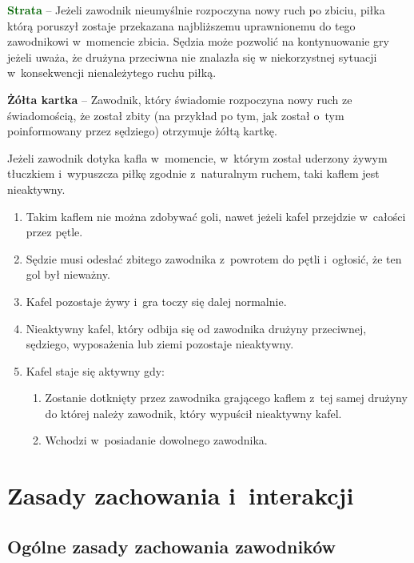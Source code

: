 \documentclass[12pt,a4paper]{article}
\renewcommand{\paragraph}[1]{
  \oldparagraph{#1}%
  \leftskip2.8cm
}
\newcommand\yellowcard[1]{\bgroup\textcolor{darkyellow}{\textbf{#1}}}
\newcommand\other[1]{\bgroup\textcolor{darkgreen}{\textbf{#1}}}
\begin{document}
\other{Strata} -- Jeżeli zawodnik nieumyślnie rozpoczyna nowy ruch po
zbiciu, piłka którą poruszył zostaje przekazana najbliższemu
uprawnionemu do tego zawodnikowi w~momencie zbicia. Sędzia może pozwolić
na kontynuowanie gry jeżeli uważa, że drużyna przeciwna nie znalazła się
w niekorzystnej sytuacji w~konsekwencji nienależytego ruchu piłką.

\yellowcard{Żółta kartka} -- Zawodnik, który świadomie rozpoczyna nowy ruch ze
świadomością, że został zbity (na przykład po tym, jak został o~tym
poinformowany przez sędziego) otrzymuje żółtą kartkę.

\paragraph{Nieaktywny kafel}
Jeżeli zawodnik dotyka kafla w~momencie, w~którym został uderzony żywym tłuczkiem i~wypuszcza piłkę
zgodnie z~naturalnym ruchem, taki kaflem jest nieaktywny.

\begin{enumerate}
	\item
	      Takim kaflem nie można zdobywać goli, nawet jeżeli kafel przejdzie w~całości przez pętle.
	\item
	      Sędzie musi odesłać zbitego zawodnika z~powrotem do pętli i~ogłosić,
	      że ten gol był nieważny.
	\item
	      Kafel pozostaje żywy i~gra toczy się dalej normalnie.
	\item
	      Nieaktywny kafel, który odbija się od zawodnika drużyny przeciwnej,
	      sędziego, wyposażenia lub ziemi pozostaje nieaktywny.
	\item
	      Kafel staje się aktywny gdy:

	      \begin{enumerate}
		      \item
		            Zostanie dotknięty przez zawodnika grającego kaflem z~tej samej
		            drużyny do której należy zawodnik, który wypuścił nieaktywny kafel.
		      \item
		            Wchodzi w~posiadanie dowolnego zawodnika.
	      \end{enumerate}
\end{enumerate}

\pagebreak
\section{Zasady zachowania i~interakcji}

\subsection{Ogólne zasady zachowania zawodników}
\end{document}
